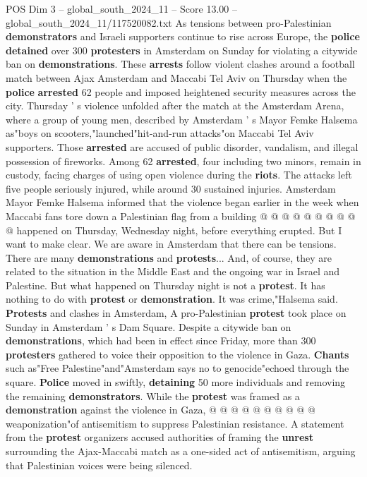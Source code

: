 \begin{textsample}{POS Dim 3 – global\_south\_2024\_11 – Score 13.00 – global\_south\_2024\_11/117520082.txt}  \label{ex:f3_pos_300}
As tensions between pro-Palestinian \textbf{demonstrators} and Israeli supporters continue to rise across Europe, the \textbf{police} \textbf{detained} over 300 \textbf{protesters} in Amsterdam on Sunday for violating a citywide ban on \textbf{demonstrations}.
These \textbf{arrests} follow violent clashes around a football match between Ajax Amsterdam and Maccabi Tel Aviv on Thursday when the \textbf{police} \textbf{arrested} 62 people and imposed heightened security measures across the city.
Thursday ' s violence unfolded after the match at the Amsterdam Arena, where a group of young men, described by Amsterdam ' s Mayor Femke Halsema as"boys on scooters,"launched"hit-and-run attacks"on Maccabi Tel Aviv supporters.
Those \textbf{arrested} are accused of public disorder, vandalism, and illegal possession of fireworks.
Among 62 \textbf{arrested}, four including two minors, remain in custody, facing charges of using open violence during the \textbf{riots}.
The attacks left five people seriously injured, while around 30 sustained injuries.
Amsterdam Mayor Femke Halsema informed that the violence began earlier in the week when Maccabi fans tore down a Palestinian flag from a building @ @ @ @ @ @ @ @ @ @ happened on Thursday, Wednesday night, before everything erupted.
But I want to make clear.
We are aware in Amsterdam that there can be tensions.
There are many \textbf{demonstrations} and \textbf{protests}...
And, of course, they are related to the situation in the Middle East and the ongoing war in Israel and Palestine.
But what happened on Thursday night is not a \textbf{protest}.
It has nothing to do with \textbf{protest} or \textbf{demonstration}.
It was crime,"Halsema said. \textbf{Protests} and clashes in Amsterdam, A pro-Palestinian \textbf{protest} took place on Sunday in Amsterdam ' s Dam Square.
Despite a citywide ban on \textbf{demonstrations}, which had been in effect since Friday, more than 300 \textbf{protesters} gathered to voice their opposition to the violence in Gaza. \textbf{Chants} such as"Free Palestine"and"Amsterdam says no to genocide"echoed through the square. \textbf{Police} moved in swiftly, \textbf{detaining} 50 more individuals and removing the remaining \textbf{demonstrators}.
While the \textbf{protest} was framed as a \textbf{demonstration} against the violence in Gaza, @ @ @ @ @ @ @ @ @ @ weaponization"of antisemitism to suppress Palestinian resistance.
A statement from the \textbf{protest} organizers accused authorities of framing the \textbf{unrest} surrounding the Ajax-Maccabi match as a one-sided act of antisemitism, arguing that Palestinian voices were being silenced.

\end{textsample}
